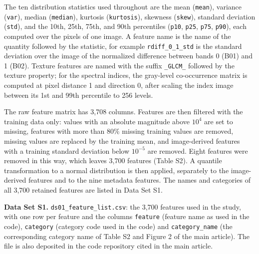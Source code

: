 \documentclass[draft,ea]{agutexSI2019}
\begin{document}
\begin{article}
The ten distribution statistics used throughout are the mean (\texttt{mean}), variance (\texttt{var}), median (\texttt{median}), kurtosis (\texttt{kurtosis}), skewness (\texttt{skew}), standard deviation (\texttt{std}), and the 10th, 25th, 75th, and 90th percentiles (\texttt{p10}, \texttt{p25}, \texttt{p75}, \texttt{p90}), each computed over the pixels of one image. A feature name is the name of the quantity followed by the statistic, for example \texttt{rdiff\_0\_1\_std} is the standard deviation over the image of the normalized difference between bands 0 (B01) and 1 (B02). Texture features are named with the suffix \texttt{\_GLCM\_} followed by the texture property; for the spectral indices, the gray-level co-occurrence matrix is computed at pixel distance 1 and direction 0, after scaling the index image between its 1st and 99th percentile to 256 levels.

The raw feature matrix has 3,708 columns. Features are then filtered with the training data only: values with an absolute magnitude above $10^{4}$ are set to missing, features with more than 80\% missing training values are removed, missing values are replaced by the training mean, and image-derived features with a training standard deviation below $10^{-5}$ are removed. Eight features were removed in this way, which leaves 3,700 features (Table S2). A quantile transformation to a normal distribution is then applied, separately to the image-derived features and to the nine metadata features. The names and categories of all 3,700 retained features are listed in Data Set S1.

\noindent\textbf{Data Set S1.} \texttt{ds01\_feature\_list.csv}: the 3,700 features used in the study, with one row per feature and the columns \texttt{feature} (feature name as used in the code), \texttt{category} (category code used in the code) and \texttt{category\_name} (the corresponding category name of Table S2 and Figure 2 of the main article). The file is also deposited in the code repository cited in the main article.

\end{article}
\clearpage
\end{document}
